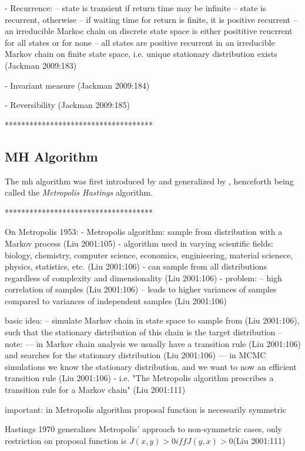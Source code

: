 \documentclass[11pt]{article}
\begin{document}
- Recurrence: 
-- state is transient  if return time may be infinite
-- state is recurrent, otherwise
-- if waiting time for return is finite, it is positive recurrent
-- an irreducible Markoc chain on discrete state space is either posititive reucrrent for all
	states or for none
-- all states are positive recurrent in an irreducible Markov chain on finite state space, 
	i.e. unique stationary distribution exists (Jackman 2009:183)
	
- Invariant measure (Jackman 2009:184)

- Reversibility (Jackman 2009:185)

************************************



\subsection{MH Algorithm}

The \gls{mh} algorithm was first introduced by \textcite{metroplis1953} and generalized by \textcite{hastings1970}, henceforth being called the \textit{Metropolis Hastings} algorithm. 

************************************

On Metropolis 1953:
- Metropolis algorithm: sample from distribution with a Markov process (Liu 2001:105)
- algorithm used in varying scientific fields: biology, chemistry, computer science, economics, enginieering, material scienece, physics, statistics, etc. (Liu 2001:106)
- can sample from all distributions regardless of complexity and dimensionality (Liu 2001:106)
- problem: 
-- high correlation of samples (Liu 2001:106)
-- leads to higher variances of samples compared to variances of independent samples (Liu 2001:106)

basic idea:
-- simulate Markov chain in state space to sample from (Liu 2001:106), such 
	that the stationary distribution of this chain is the target distribution
-- note:
--- in Markov chain analysis we usually have a transition rule (Liu 2001:106) and searches
	for the stationary distribution (Liu 2001:106)
--- in MCMC simulations we know the stationary distribution, and we want to now an efficient
	transition rule (Liu 2001:106)
- i.e. "The Metropolis algorithm prescribes a transition rule for a Markov chain" (Liu 2001:111)


important: in Metropolis algorithm proposal function is necessarily symmetric

Hastings 1970 generalizes Metropolis' approach to non-symmetric cases, only restriction
on proposal function is $J(x,y) > 0 iff J(y,x) > 0 $(Liu 2001:111)
\end{document}
